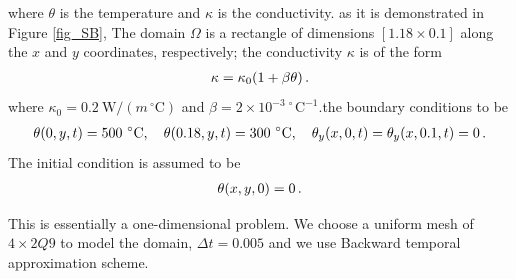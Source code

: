 \documentclass[]{article}
\begin{document}
where $\theta$ is the temperature and $\kappa$ is the conductivity. as it is demonstrated in Figure \ref{fig_SB}, The domain $\Omega$ is a rectangle of dimensions $[1.18 \times 0.1]$ along the $x$ and $y$ coordinates, respectively; the conductivity $\kappa$ is of the form
\begin{equation}\label{eq2}
	\begin{aligned}
		\kappa = \kappa_0(1+\beta\theta)\thinspace.
	\end{aligned}
\end{equation}
where $\kappa_0=0.2 \ \text{W}/(m^{\ \circ}\text{C})$ and $\beta=2 \times 10^{-3 \ \circ}\text{C}^{-1}$.the boundary conditions to be
\begin{equation}\label{eq3}
	\begin{aligned}
		\theta(0,y,t) = 500^{ \ \circ}\text{C} , \quad \theta(0.18,y,t) = 300^{ \ \circ}\text{C}, \quad \theta_y(x,0,t) = \theta_y(x,0.1,t)=0\thinspace.
	\end{aligned}
\end{equation}
The initial condition is assumed to be
\begin{equation}\label{eq4}
	\begin{aligned}
		\theta(x,y,0) = 0\thinspace.
	\end{aligned}
\end{equation}

This is essentially a one-dimensional problem. We choose a uniform mesh of $4 \times 2Q9$ to model the domain, $\Delta t = 0.005$ and we use Backward temporal approximation scheme.
\end{document}
